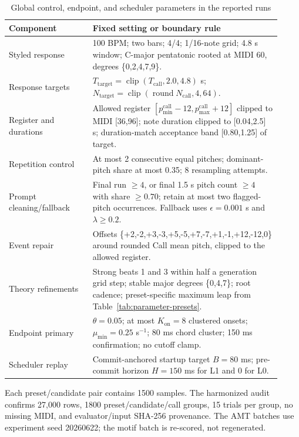 \documentclass[11pt,a4paper]{article}
\begin{document}
\begin{table}[htbp]
\centering
\caption{Global control, endpoint, and scheduler parameters in the reported runs}
\label{tab:global-parameters}
\scriptsize
\begin{tabular}{L{0.29\linewidth}L{0.63\linewidth}}
\toprule
Component & Fixed setting or boundary rule \\
\midrule
Styled response & 100 BPM; two bars; 4/4; 1/16-note grid; 4.8 s window; C-major pentatonic rooted at MIDI 60, degrees \{0,2,4,7,9\}. \\
Response targets & $T_{\mathrm{target}}=\operatorname{clip}(T_{\mathrm{call}},2.0,4.8)$ s; $N_{\mathrm{target}}=\operatorname{clip}(\operatorname{round}N_{\mathrm{call}},4,64)$. \\
Register and durations & Allowed register $[p_{\min}^{\mathrm{call}}-12,p_{\max}^{\mathrm{call}}+12]$ clipped to MIDI [36,96]; note duration clipped to [0.04,2.5] s; duration-match acceptance band [0.80,1.25] of target. \\
Repetition control & At most 2 consecutive equal pitches; dominant-pitch share at most 0.35; 8 resampling attempts. \\
Prompt cleaning/fallback & Final run $\geq4$, or final 1.5 s pitch count $\geq4$ with share $\geq0.70$; retain at most two flagged-pitch occurrences. Fallback uses $\epsilon=0.001$ s and $\lambda\geq0.2$. \\
Event repair & Offsets \{+2,-2,+3,-3,+5,-5,+7,-7,+1,-1,+12,-12,0\} around rounded Call mean pitch, clipped to the allowed register. \\
Theory refinements & Strong beats 1 and 3 within half a generation grid step; stable major degrees \{0,4,7\}; root cadence; preset-specific maximum leap from Table~\ref{tab:parameter-presets}. \\
Endpoint primary & $\theta=0.05$; at most $K_{\mathrm{on}}=8$ clustered onsets; $\mu_{\min}=0.25$ s$^{-1}$; 80 ms chord cluster; 150 ms confirmation; no cutoff clamp. \\
Scheduler replay & Commit-anchored startup target $B=80$ ms; pre-commit horizon $H=150$ ms for L1 and 0 for L0. \\
\bottomrule
\end{tabular}
\end{table}

Each preset/candidate pair contains 1500 samples. The harmonized audit confirms 27,000 rows, 1800 preset/candidate/call groups, 15 trials per group, no missing MIDI, and evaluator/input SHA-256 provenance. The AMT batches use experiment seed 20260622; the motif batch is re-scored, not regenerated.
\end{document}
